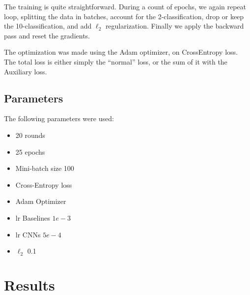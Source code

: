 \documentclass[10pt,conference]{IEEEtran}
\begin{document}
The training is quite straightforward. During a count of epochs, we again repeat loop, splitting the data in batches, account for the 2-classification, drop or keep the 10-classification, and add $\ell_2$ regularization. Finally we apply the backward pass and reset the gradients.

The optimization was made using the Adam optimizer, on CrossEntropy loss. The total loss is either simply the ``normal'' loss, or the sum of it with the Auxiliary loss.
\subsection{Parameters}
The following parameters were used:
\begin{multicols}{2}
    \begin{itemize}
        \item 20 rounds
        \item 25 epochs
        \item Mini-batch size 100
        \item Cross-Entropy loss
        \item Adam Optimizer
        \item lr Baselines $1e-3$
        \item lr CNNs $5e-4$
        \item $\ell_2$ 0.1
    \end{itemize}
\end{multicols}
\section{Results}
\end{document}
